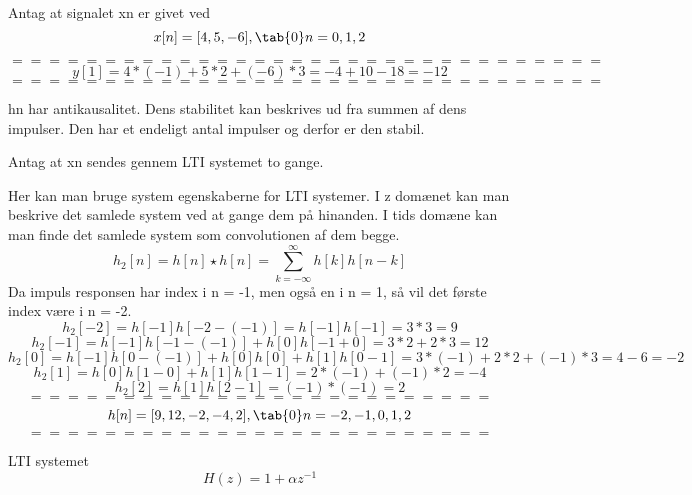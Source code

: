 \begin{rubrik}
\begin{eksamensOpgave}
\begin{UnderOpgave}
        \end{UnderOpgave}
        Antag at signalet xn er givet ved 
        \[x[n] = [4, 5, -6], \tab{0} n = 0, 1, 2\]
        \begin{UnderOpgave}
            \[================================\]
            \[y[1] = 4 * (-1) + 5 * 2 + (-6) * 3 = -4 + 10 - 18 = -12\] 
            \[================================\]
        \end{UnderOpgave}
        \begin{UnderOpgave}
            hn har antikausalitet.
            Dens stabilitet kan beskrives ud fra summen af dens impulser. 
            Den har et endeligt antal impulser og derfor er den stabil.             
        \end{UnderOpgave}
        Antag at xn sendes gennem LTI systemet to gange. 
        \begin{UnderOpgave}
            Her kan man bruge system egenskaberne for LTI systemer. I z domænet kan man beskrive det samlede system ved at gange dem på hinanden. 
            I tids domæne kan man finde det samlede system som convolutionen af dem begge.
            \[h_2[n] = h[n]\star h[n] = \sum_{k = -\infty}^{\infty}{h[k]h[n - k]}\] 
            Da impuls responsen har index i n = -1, men også en i n = 1, så vil det første index være i n = -2. 
            \[h_2[-2] = h[-1]h[-2 - (-1)] = h[-1]h[-1] = 3*3 = 9\]
            \[h_2[-1] = h[-1]h[-1 - (-1)] + h[0]h[-1 + 0] = 3 * 2 + 2 * 3 = 12\]
            \[h_2[0] = h[-1]h[0 - (-1)] + h[0]h[0] + h[1]h[0 - 1] = 3 * (-1) + 2 * 2 + (-1) * 3 = 4 - 6 = -2\]
            \[h_2[1] = h[0]h[1 - 0] + h[1]h[1 - 1] = 2 * (-1) + (-1) * 2 = -4\]
            \[h_2[2] = h[1]h[2 - 1] = (-1) * (-1) = 2\]
            \[=========================\]
            \[h[n] = [9, 12, -2, -4, 2], \tab{0} n = -2, -1, 0, 1, 2\]
            \[=========================\]
        \end{UnderOpgave}
    \end{eksamensOpgave}
    \begin{eksamensOpgave}
        LTI systemet 
        \[H(z) = 1 + \alpha z^{-1}\]


\end{eksamensOpgave}
\end{rubrik}
